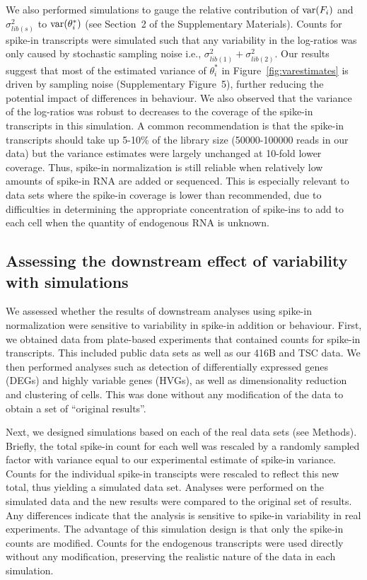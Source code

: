 \documentclass{article}
\newcommand{\suppfignoise}{5}
\newcommand{\suppsecnoise}{2}
\begin{document}
We also performed simulations to gauge the relative contribution of $\mbox{var}(F_i)$ and $\sigma^2_{lib(s)}$ to $\mbox{var}(\theta^*_i)$ (see Section~\suppsecnoise{} of the Supplementary Materials).
Counts for spike-in transcripts were simulated such that any variability in the log-ratios was only caused by stochastic sampling noise i.e., $\sigma^2_{lib(1)} + \sigma^2_{lib(2)}$.
Our results suggest that most of the estimated variance of $\theta^*_i$ in Figure~\ref{fig:varestimates} is driven by sampling noise (Supplementary Figure~\suppfignoise{}), further reducing the potential impact of differences in behaviour.
We also observed that the variance of the log-ratios was robust to decreases to the coverage of the spike-in transcripts in this simulation.
A common recommendation is that the spike-in transcripts should take up 5-10\% of the library size (50000-100000 reads in our data) but the variance estimates were largely unchanged at 10-fold lower coverage.
Thus, spike-in normalization is still reliable when relatively low amounts of spike-in RNA are added or sequenced.
This is especially relevant to data sets where the spike-in coverage is lower than recommended, due to difficulties in determining the appropriate concentration of spike-ins to add to each cell when the quantity of endogenous RNA is unknown.

\subsection{Assessing the downstream effect of variability with simulations}
We assessed whether the results of downstream analyses using spike-in normalization were sensitive to variability in spike-in addition or behaviour.
First, we obtained data from plate-based experiments that contained counts for spike-in transcripts.
This included public data sets \cite{segerstople2016single,islam2011characterization} as well as our 416B and TSC data.
We then performed analyses such as detection of differentially expressed genes (DEGs) and highly variable genes (HVGs), as well as dimensionality reduction and clustering of cells.
This was done without any modification of the data to obtain a set of ``original results''.

Next, we designed simulations based on each of the real data sets (see Methods).
Briefly, the total spike-in count for each well was rescaled by a randomly sampled factor with variance equal to our experimental estimate of spike-in variance.
Counts for the individual spike-in transcipts were rescaled to reflect this new total, thus yielding a simulated data set.
Analyses were performed on the simulated data and the new results were compared to the original set of results.
Any differences indicate that the analysis is sensitive to spike-in variability in real experiments.
The advantage of this simulation design is that only the spike-in counts are modified.
Counts for the endogenous transcripts were used directly without any modification, preserving the realistic nature of the data in each simulation.
\end{document}
